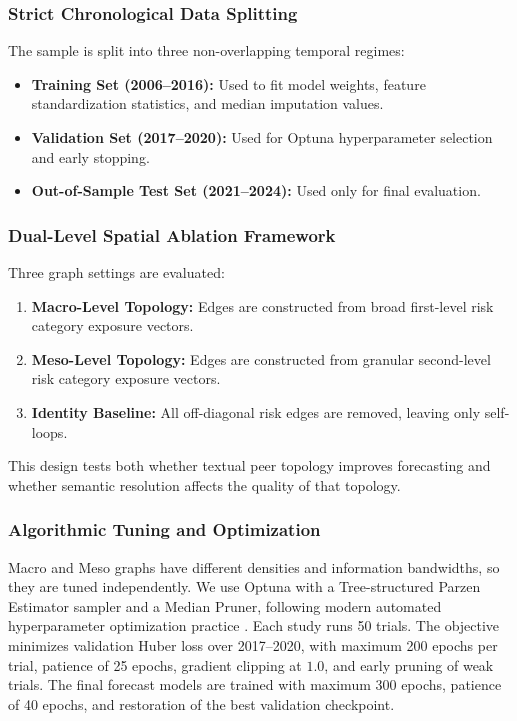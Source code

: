 \documentclass[11pt, a4paper]{article}
\begin{document}
\subsubsection{Strict Chronological Data Splitting}
The sample is split into three non-overlapping temporal regimes:
\begin{itemize}
    \item \textbf{Training Set (2006--2016):} Used to fit model weights, feature standardization statistics, and median imputation values.
    \item \textbf{Validation Set (2017--2020):} Used for Optuna hyperparameter selection and early stopping.
    \item \textbf{Out-of-Sample Test Set (2021--2024):} Used only for final evaluation.
\end{itemize}

\subsubsection{Dual-Level Spatial Ablation Framework}
Three graph settings are evaluated:
\begin{enumerate}
    \item \textbf{Macro-Level Topology:} Edges are constructed from broad first-level risk category exposure vectors.
    \item \textbf{Meso-Level Topology:} Edges are constructed from granular second-level risk category exposure vectors.
    \item \textbf{Identity Baseline:} All off-diagonal risk edges are removed, leaving only self-loops.
\end{enumerate}
This design tests both whether textual peer topology improves forecasting and whether semantic resolution affects the quality of that topology.

\subsubsection{Algorithmic Tuning and Optimization}
Macro and Meso graphs have different densities and information bandwidths, so they are tuned independently. We use Optuna with a Tree-structured Parzen Estimator sampler and a Median Pruner, following modern automated hyperparameter optimization practice \citep{akiba2019optuna}. Each study runs 50 trials. The objective minimizes validation Huber loss over 2017--2020, with maximum 200 epochs per trial, patience of 25 epochs, gradient clipping at $1.0$, and early pruning of weak trials. The final forecast models are trained with maximum 300 epochs, patience of 40 epochs, and restoration of the best validation checkpoint.
\end{document}
